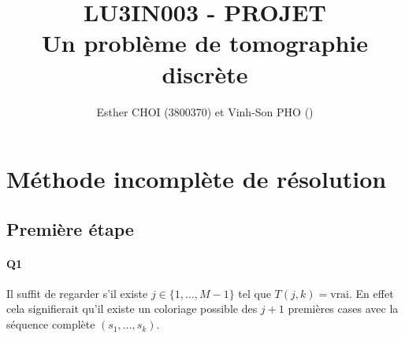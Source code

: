 \documentclass[12pt]{article}
\title{LU3IN003 - PROJET \\ Un problème de tomographie discrète\\}
\author{Esther CHOI (3800370) et Vinh-Son PHO ()}
\newcommand{\true}{\text{vrai}}
\begin{document}
	\maketitle
	\tableofcontents
	\newpage
	
	\section{Méthode incomplète de résolution}
	
		\subsection{Première étape}
		
			\paragraph{Q1}
				Il suffit de regarder s'il existe $ j \in \{1,...,M-1\} $ tel que $ T(j,k) = \true $. En effet cela signifierait qu'il existe un coloriage possible des $ j+1 $ premières cases avec la séquence complète $ (s_1,...,s_k) $.
			
\end{document}
